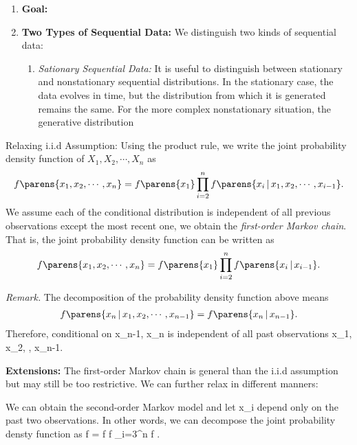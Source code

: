 \begin{enumerate}
  \item \textbf{Goal:}


  \item \textbf{Two Types of Sequential Data:} We distinguish two kinds of sequential data:
  \begin{enumerate}
    \item \textit{Sationary Sequential Data:} It is useful to distinguish between stationary and nonstationary sequential distributions.
In the stationary case, the data evolves in time, but the distribution from
which it is generated remains the same. For the more complex nonstationary situation,
the generative distribution

  \end{enumerate}
\end{enumerate}

\item Relaxing i.i.d Assumption: Using the product rule, we write the joint probability density function of $X_1, X_2, \cdots, X_n$ as
\begin{align}
  f \parens{x_1, x_2, \cdots, x_n} = f \parens{x_1} \prod_{i=2}^n f \parens{x_i \,\vert\, x_1, x_2, \cdots, x_{i-1}}.
\end{align}
We assume each of the conditional distribution is independent of all previous observations except the most recent one, we obtain the \emph{first-order Markov chain}. That is, the joint probability density function can be written as
\begin{align}
  f \parens{x_1, x_2, \cdots, x_n} = f \parens{x_1} \prod_{i=2}^n f \parens{x_i \,\vert\, x_{i-1}}.
\end{align}

\textit{Remark.} The decomposition of the probability density function above means
\begin{align}
f \parens{x_n \,\vert\, x_1, x_2, \cdots, x_{n-1}} = f \parens{x_n \,\vert\, x_{n-1}}.
\end{align}
Therefore, conditional on x_{n-1}, x_n is independent of all past observations x_1, x_2, \cdots, x_{n-1}.

\item \textbf{Extensions:} The first-order Markov chain is general than the i.i.d assumption but may still be too restrictive. We can further relax in different manners:

We can obtain the second-order Markov model and let x_i depend only on the past two observations. In other words, we can decompose the joint probability densty function as
f  = f  f  \prod_{i=3}^n f .

